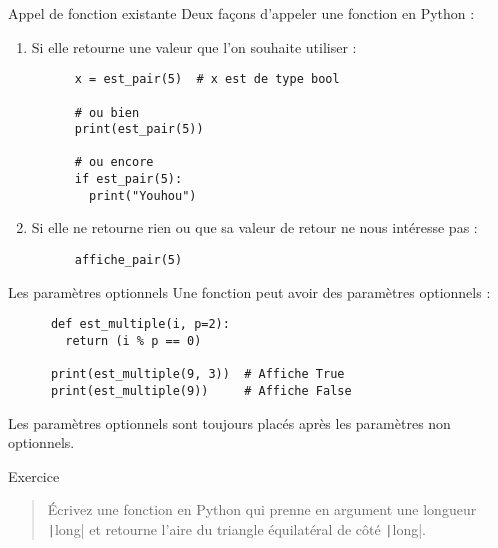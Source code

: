 \documentclass[10pt]{beamer}
\begin{document}
\begin{frame}[fragile]{Appel de fonction existante}  
  Deux façons d'appeler une fonction en Python :
  \begin{enumerate}
    \item Si elle retourne une valeur que l'on souhaite utiliser :
    
    \begin{beamercodeblock}
      \begin{verbatim}
      x = est_pair(5)  # x est de type bool

      # ou bien
      print(est_pair(5))

      # ou encore
      if est_pair(5):
        print("Youhou")
      \end{verbatim}
    \end{beamercodeblock}

    \item Si elle ne retourne rien ou que sa valeur de \alert{retour} ne nous intéresse pas :
    
    \begin{beamercodeblock}
      \begin{verbatim}
      affiche_pair(5)
      \end{verbatim}
    \end{beamercodeblock}
  \end{enumerate}
\end{frame}

\begin{frame}[fragile]{Les paramètres optionnels}  
  Une fonction peut avoir des paramètres optionnels :
    
    \begin{beamercodeblock}
      \begin{verbatim}
      def est_multiple(i, p=2):
        return (i % p == 0)
      
      print(est_multiple(9, 3))  # Affiche True
      print(est_multiple(9))     # Affiche False
      \end{verbatim}
    \end{beamercodeblock}

  Les paramètres optionnels sont toujours placés \alert{après} les paramètres non optionnels.
\end{frame}

\begin{frame}{Exercice}
  \begin{quote}
    Écrivez une fonction en Python qui prenne en argument une longueur \texttt|long| et retourne l'aire du triangle équilatéral de côté \texttt|long|.
  \end{quote}
\end{frame}
\end{document}
